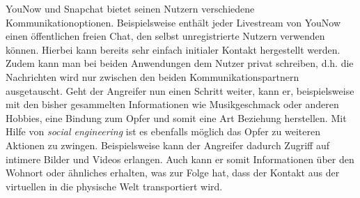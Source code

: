 YouNow und Snapchat bietet seinen Nutzern verschiedene Kommunikationoptionen.
Beispielsweise enth\"alt jeder Livestream von YouNow einen \"offentlichen
freien Chat, den selbst unregistrierte Nutzern verwenden k\"onnen. Hierbei kann
bereits sehr einfach initialer Kontakt hergestellt werden. Zudem kann man bei
beiden Anwendungen dem Nutzer privat schreiben, d.h. die Nachrichten wird nur
zwischen den beiden Kommunikationspartnern ausgetauscht. Geht der Angreifer nun
einen Schritt weiter, kann er, beispielsweise mit den bisher gesammelten
Informationen wie Musikgeschmack oder anderen Hobbies, eine Bindung zum Opfer
und somit eine Art Beziehung herstellen. Mit Hilfe von \emph{social
engineering} ist es ebenfalls m\"oglich das Opfer zu weiteren Aktionen zu
zwingen. Beispielsweise kann der Angreifer dadurch Zugriff auf intimere Bilder
und Videos erlangen. Auch kann er somit Informationen \"uber den Wohnort oder
\"ahnliches erhalten, was zur Folge hat, dass der Kontakt aus der virtuellen in
die physische Welt transportiert wird.
